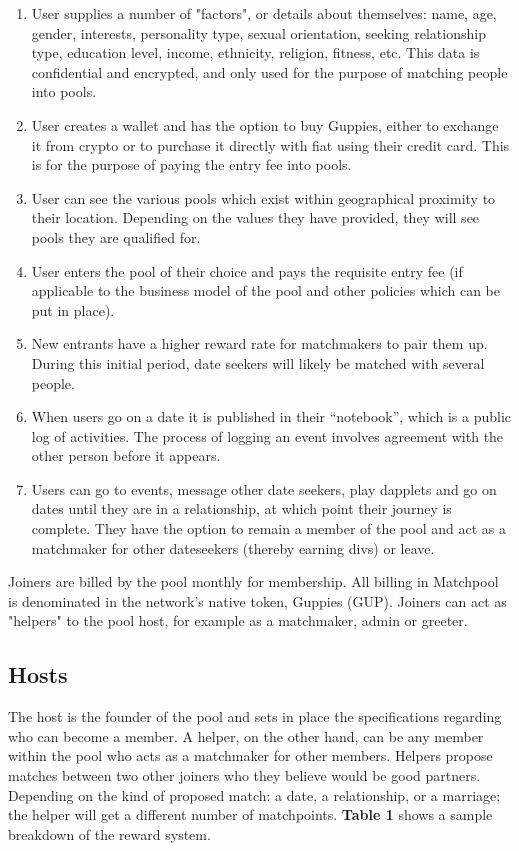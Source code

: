 \documentclass[a4paper]{article}
\begin{document}
\begin{enumerate}
\item
User supplies a number of "factors", or details about themselves: name, age, gender, interests, personality type, sexual orientation, seeking relationship type, education level, income, ethnicity, religion, fitness, etc. This data is confidential and encrypted, and only used for the purpose of matching people into pools.
\item
User creates a wallet and has the option to buy Guppies, either to exchange it from crypto or to purchase it directly with fiat using their credit card. This is for the purpose of paying the entry fee into pools.
\item
User can see the various pools which exist within geographical proximity to their location. Depending on the values they have provided, they will see pools they are qualified for.
\item
User enters the pool of their choice and pays the requisite entry fee (if applicable to the business model of the pool and other policies which can be put in place).
\item
New entrants have a higher reward rate for matchmakers to pair them up. During this initial period, date seekers will likely be matched with several people.
\item
When users go on a date it is published in their “notebook”, which is a public log of activities. The process of logging an event involves agreement with the other person before it appears.
\item
Users can go to events, message other date seekers, play dapplets and go on dates until they are in a relationship, at which point their journey is complete. They have the option to remain a member of the pool and act as a matchmaker for other dateseekers (thereby earning divs) or leave.
\end{enumerate}

Joiners are billed by the pool monthly for membership. All billing in Matchpool is denominated in the network's native token, Guppies (GUP). Joiners can act as "helpers" to the pool host, for example as a matchmaker, admin or greeter.

\subsection{Hosts}

The host is the founder of the pool and sets in place the specifications regarding who can become a member. A helper, on the other hand, can be any member within the pool who acts as a matchmaker for other members. Helpers propose matches between two other joiners who they believe would be good partners. Depending on the kind of proposed match: a date, a relationship, or a marriage; the helper will get a different number of matchpoints. \textbf{Table 1} shows a sample breakdown of the reward system.
\end{document}
